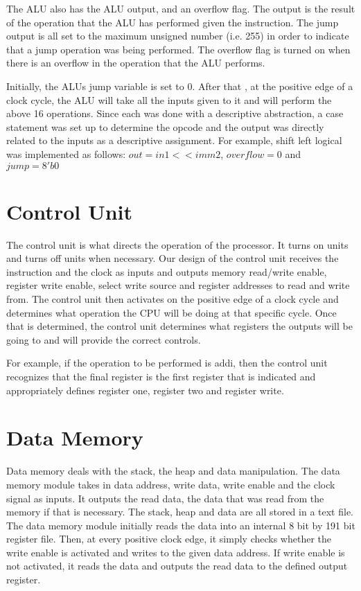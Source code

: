 \documentclass[journal]{IEEEtran}
\begin{document}
The ALU also has the ALU output, and an overflow flag. The output is the result of the operation that the ALU has performed given the instruction. The jump output is all set to the maximum unsigned number (i.e. 255) in order to indicate that a jump operation was being performed.  The overflow flag is turned on when there is an overflow in the operation that the ALU performs. 

Initially, the ALUs jump variable is set to 0. After that , at the positive edge of a clock cycle, the ALU will take all the inputs given to it and will perform the above 16 operations. Since each was done with a descriptive abstraction, a case statement was set up to determine the opcode and the output was directly related to the inputs as a descriptive assignment. For example, shift left logical was implemented as follows: $ out = in1<<imm2 $, $overflow  = 0$ and $jump = 8'b0$ 


\section{Control Unit}
The control unit is what directs the operation of the processor. It turns on units and turns off units when necessary. Our design of the control unit receives the instruction and the clock as inputs and outputs memory read/write enable, register write enable, select write source and register addresses to read and write from. The control unit then activates on the positive edge of a clock cycle and determines what operation the CPU will be doing at that specific cycle. Once that is determined, the control unit determines what registers the outputs will be going to and will provide the correct controls. 

For example, if the operation to be performed is addi, then the control unit recognizes that the final register is the first register that is indicated and appropriately defines register one, register two and register write. 

\section{Data Memory}
Data memory deals with the stack, the heap and data manipulation. The data memory module takes in data address, write data, write enable and the clock signal as inputs. It outputs the read  data, the data that was read from the memory if that is necessary. The stack, heap and data are all stored in a text file. The data memory module initially reads the data into an internal 8 bit by  191 bit register file. Then, at every positive clock edge, it simply checks whether the write enable is activated and writes to the given data address. If write enable is not activated, it reads the data and outputs the read data to the defined output register.
\end{document}
